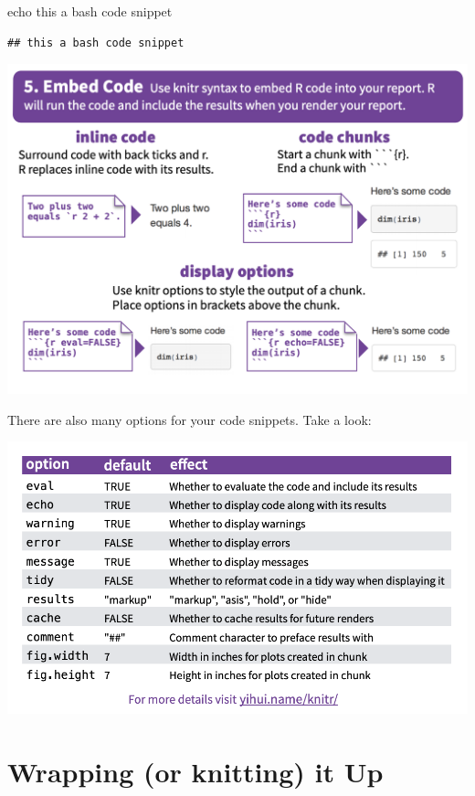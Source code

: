 \documentclass[]{book}
\newenvironment{Shaded}{\begin{snugshade}}{\end{snugshade}}
\newcommand{\BuiltInTok}[1]{#1}
\newcommand{\NormalTok}[1]{#1}
\begin{document}
\begin{Shaded}
\begin{Highlighting}[]
\BuiltInTok{echo}\NormalTok{ this a bash code snippet}
\end{Highlighting}
\end{Shaded}

\begin{verbatim}
## this a bash code snippet
\end{verbatim}

\includegraphics{images/code.png}

There are also many options for your code snippets. Take a look:

\includegraphics{images/options.png}

\hypertarget{wrapping-or-knitting-it-up}{%
\section{Wrapping (or knitting) it Up}\label{wrapping-or-knitting-it-up}}
\end{document}
